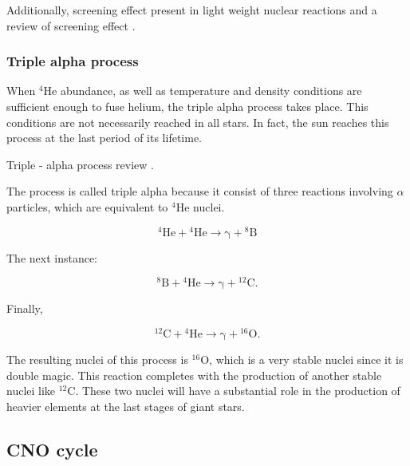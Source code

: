 \documentclass[openany]{book}
\begin{document}
Additionally, screening effect present in light weight nuclear reactions \cite{raiola_migliardi_gyurky_aliotta_formicola_bonetti_broggini_campajola_corvisiero_costantini_et_2002} and a review of screening effect \cite{assenbaum_langanke_rolfs_1987}.

\subsubsection{Triple alpha process}

When $\mathrm{{}^{4}He}$ abundance, as well as temperature and density conditions are sufficient enough to fuse helium, the triple alpha process takes place. This conditions are not necessarily reached in all stars. In fact, the sun reaches this process at the last period of its lifetime.  

Triple - alpha process review \cite{coc_2012}.

The process is called triple alpha because it consist of three reactions involving $\alpha$ particles, which are equivalent to  $\mathrm{{}^{4}He}$ nuclei. 

\begin{equation}\label{eq:reaction_tripleAlpha_1}
	\mathrm{{}^{4}He + {}^{4}He \rightarrow  \gamma  + {}^{8}B }
\end{equation}

The next instance:

\begin{equation}\label{eq:reaction_tripleAlpha_2}
	\mathrm{{}^{8}B+ {}^{4}He \rightarrow  \gamma + {}^{12}C}. 
\end{equation}

Finally, 

\begin{equation}\label{eq:reaction_tripleAlpha_3}
	\mathrm{{}^{12}C + {}^{4}He \rightarrow \gamma + {}^{16}O}.
\end{equation}

The resulting nuclei of this process is $\mathrm{{}^{16}O}$, which is a very stable nuclei since it is double magic. This reaction completes with the production of another stable nuclei like $\mathrm{{}^{12}C}$. These two nuclei will have a substantial role in the production of heavier elements at the last stages of giant stars.

\subsection{CNO cycle}  \label{sub:CNOCycle}
\end{document}

